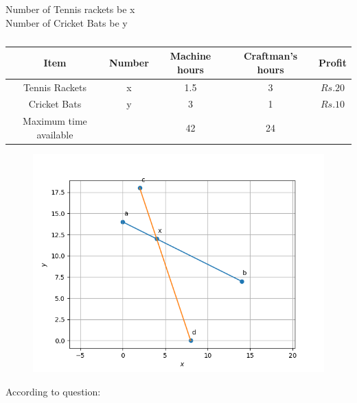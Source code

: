 \documentclass[10pt, a4paper]{article}
\begin{document}
\begin{center}
Number of Tennis rackets be x\\
Number of Cricket Bats be y\\
\end{center}
\fi
\begin{table}[!ht]
	\centering
\begin{tabular}{|c|c|c|c|c|}
	\hline
	\textbf{Item}&\textbf{Number}&\textbf{Machine hours}&\textbf{Craftman's hours}&\textbf{Profit}\\
	\hline
	Tennis Rackets&x&1.5&3&$Rs.20$\\
	\hline
	Cricket Bats&y&3&1&$Rs.10$\\
	\hline
	Maximum time available& &42&24\\
	\hline
\end{tabular}
	\caption{}
		\label{table:12/12/2/3}
\end{table}
	\begin{figure}[!ht]
		\centering
		\includegraphics[width=\columnwidth]{12/12/2/3/figs/optm.png}
		\caption{}
		\label{fig:12/12/2/3}
  	\end{figure}
	\iffalse
According to question:
\end{document}
